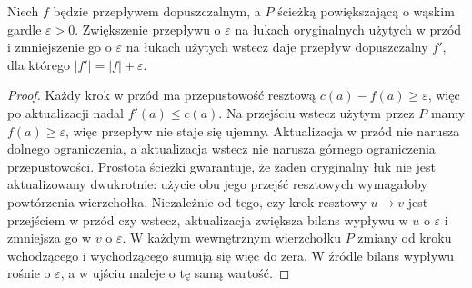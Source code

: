 \begin{lemat}
\label{lem:tg-flow-augment}
Niech $f$ będzie przepływem dopuszczalnym,
a $P$ ścieżką powiększającą o wąskim gardle
$\varepsilon>0$. Zwiększenie przepływu o
$\varepsilon$ na łukach oryginalnych użytych w przód
i zmniejszenie go o $\varepsilon$ na łukach użytych
wstecz daje przepływ dopuszczalny $f'$,
dla którego $|f'|=|f|+\varepsilon$.
\end{lemat}
\begin{proof}
Każdy krok w przód ma przepustowość resztową
$c(a)-f(a)\geq\varepsilon$, więc po aktualizacji
nadal $f'(a)\leq c(a)$. Na przejściu wstecz użytym przez $P$ mamy
$f(a)\geq\varepsilon$, więc przepływ nie staje się
ujemny. Aktualizacja w przód nie narusza dolnego
ograniczenia, a aktualizacja wstecz nie narusza
górnego ograniczenia przepustowości. Prostota ścieżki gwarantuje, że żaden oryginalny łuk
nie jest aktualizowany dwukrotnie: użycie obu jego
przejść resztowych wymagałoby powtórzenia wierzchołka.
Niezależnie od tego, czy krok resztowy $u\to v$ jest
przejściem w przód czy wstecz, aktualizacja zwiększa
bilans wypływu w $u$ o $\varepsilon$ i zmniejsza go
w $v$ o $\varepsilon$. W każdym wewnętrznym wierzchołku
$P$ zmiany od kroku wchodzącego i wychodzącego
sumują się więc do zera.
W źródle bilans wypływu rośnie o $\varepsilon$,
a w ujściu maleje o tę samą wartość.
\end{proof}

